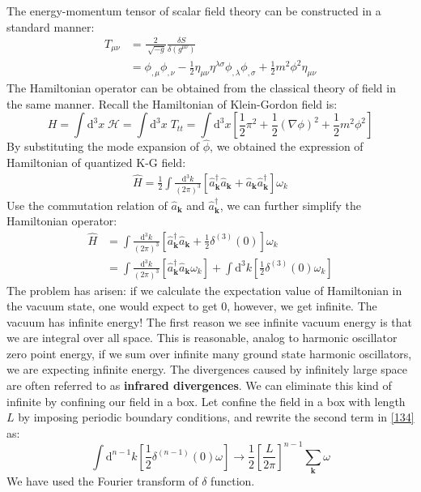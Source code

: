 \documentclass[12pt]{article}
\numberwithin{equation}{section}
\theoremstyle{1style}
\newcommand{\tbf}[1]{\textbf{#1}}
\newcommand{\id}{\mathrm{d}}
\begin{document}
The energy-momentum tensor of scalar field theory can be constructed in a standard manner:
\begin{align}
  T_{\mu\nu} & =\frac{2}{\sqrt[]{-g}}\frac{\delta S}{\delta(g^{\mu\nu})}                                         \\
             & =\phi_{,\mu}\phi_{,\nu}-\frac{1}{2}\eta_{\mu\nu}\eta^{\lambda\sigma}\phi_{,\lambda}\phi_{,\sigma}
  +\frac{1}{2}m^2\phi^2\eta_{\mu\nu}
\end{align}
The Hamiltonian operator can be obtained from the classical theory of field in the same manner.
Recall the Hamiltonian of Klein-Gordon field is:
\begin{equation}
  H=\int\id^3x\;\mathcal{H}=\int\id^3x\;T_{tt}=\int\id^3x\left[\frac{1}{2}\pi^2+\frac{1}{2}(\nabla\phi)^2+\frac{1}{2}m^2\phi^2\right]
\end{equation}
By substituting the mode expansion of \(\hat{\phi}\), we obtained the expression of Hamiltonian of quantized K-G field:
\begin{align}
  \hat{H}=\frac{1}{2}\int \frac{\id^{3}k}{(2\pi)^3}\left[\hat{a}^{\dagger}_{\mathbf{k}}\hat{a}_{\mathbf{k}}+\hat{a}_{\mathbf{k}}\hat{a}^{\dagger}_{\mathbf{k}}\right]\omega_{k}
\end{align}
Use the commutation relation of \(\hat{a}_{\mathbf{k}}\) and \(\hat{a}^{\dagger}_{\mathbf{k}}\), we can further simplify the Hamiltonian operator:
\begin{align}\label{134}
  \hat{H} & =\int \frac{\id^{3}k}{(2\pi)^3}\left[\hat{a}^{\dagger}_{\mathbf{k}}\hat{a}_{\mathbf{k}}+\frac{1}{2}\delta^{(3)}(0)\right]\omega_{k} \\
          & =\int \frac{\id^{3}k}{(2\pi)^3}\left[\hat{a}^{\dagger}_{\mathbf{k}}\hat{a}_{\mathbf{k}}\omega_{k}\right]+
  \int \id^{3}k\left[\frac{1}{2}\delta^{(3)}(0)\omega_{k}\right]
\end{align}
The problem has arisen: if we calculate the expectation value of Hamiltonian in the vacuum state, one would expect to get 0,
however, we get infinite.
The vacuum has infinite energy!
The first reason we see infinite vacuum energy is that we are integral over all space. This is reasonable, analog
to harmonic oscillator zero point energy,
if we sum over infinite many ground state harmonic oscillators, we are expecting infinite energy.
The divergences caused by infinitely large space are often referred to as \tbf{infrared divergences}.
We can eliminate this kind of infinite by confining our field in a box.
Let confine the field in a box with length \(L\) by imposing periodic boundary conditions, and rewrite the second term in \ref{134} as:
\begin{equation}\label{135}
  \int \id^{n-1}k\left[\frac{1}{2}\delta^{(n-1)}(0)\omega\right]\rightarrow\frac{1}{2}\left[\frac{L}{2\pi}\right]^{n-1}\sum_{\mathbf{k}}\omega
\end{equation}
We have used the Fourier transform of \(\delta\) function.
\end{document}
